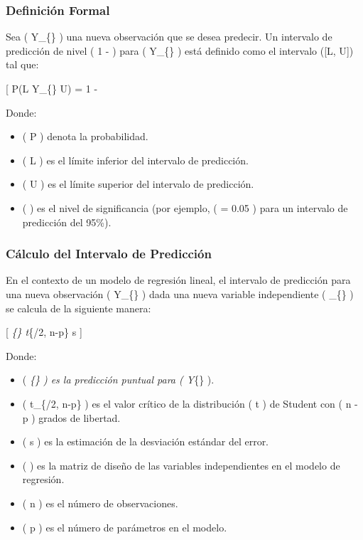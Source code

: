 \subsubsection{Definición Formal}\label{definiciuxf3n-formal}

Sea ( Y\_\{\} ) una nueva observación que se desea predecir.
Un intervalo de predicción de nivel ( 1 - \alpha ) para (
Y\_\{\} ) está definido como el intervalo ({[}L, U{]}) tal
que:

{[} P(L \leq Y\_\{\} \leq U) = 1 - \alpha {]}

Donde:

\begin{itemize}
\tightlist
\item
  ( P ) denota la probabilidad.
\item
  ( L ) es el límite inferior del intervalo de predicción.
\item
  ( U ) es el límite superior del intervalo de predicción.
\item
  ( \alpha ) es el nivel de significancia (por ejemplo, ( \alpha = 0.05
  ) para un intervalo de predicción del 95\%).
\end{itemize}

\subsubsection{Cálculo del Intervalo de
Predicción}\label{cuxe1lculo-del-intervalo-de-predicciuxf3n}

En el contexto de un modelo de regresión lineal, el intervalo de
predicción para una nueva observación ( Y\_\{\} ) dada una
nueva variable independiente ( \_\{\} ) se calcula
de la siguiente manera:

{[} \emph{\{\} \pm t}\{\alpha/2, n-p\} \cdot s
\cdot {}
{]}

Donde:

\begin{itemize}
\tightlist
\item
  ( \emph{\{\} ) es la predicción puntual para (
  Y}\{\} ).
\item
  ( t\_\{\alpha/2, n-p\} ) es el valor crítico de la distribución ( t )
  de Student con ( n - p ) grados de libertad.
\item
  ( s ) es la estimación de la desviación estándar del error.
\item
  (  ) es la matriz de diseño de las variables independientes
  en el modelo de regresión.
\item
  ( n ) es el número de observaciones.
\item
  ( p ) es el número de parámetros en el modelo.
\end{itemize}

